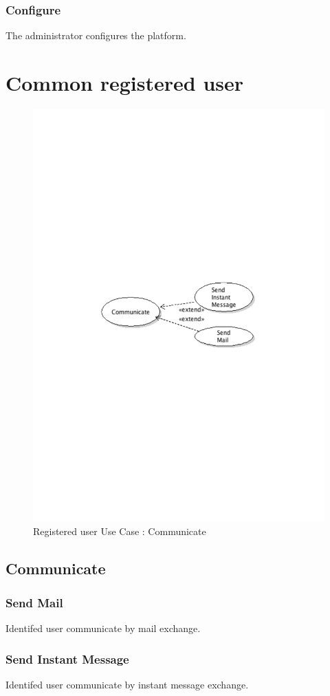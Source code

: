 		\subsubsection{Configure}
			The administrator configures the platform.
\newpage
\section{Common registered user}
	\begin{figure}[ht]
		\begin{center}
			\includegraphics[width=\textwidth,  trim=2cm 12cm 2cm 12cm]{UML_figure/UC/common/UC_Common_Communicate.pdf}
			\caption{Registered user Use Case : Communicate}
		\end{center}
	\end{figure}
	\subsection{Communicate}
		\subsubsection{Send Mail}
			Identifed user communicate by mail exchange.
		\subsubsection{Send Instant Message}
			Identifed user communicate by instant message exchange.













